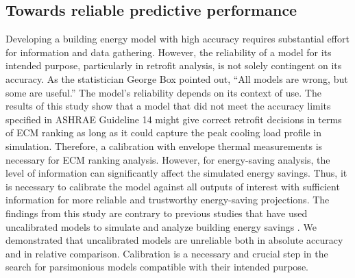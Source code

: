 \documentclass[3p,times,12pt]{elsarticle}
\begin{document}
\begin{sloppypar}
\subsection{Towards reliable predictive performance}
\label{S:4.2}
Developing a building energy model with high accuracy requires substantial effort for information and data gathering. However, the reliability of a model for its intended purpose, particularly in retrofit analysis, is not solely contingent on its accuracy. As the statistician George Box pointed out, “All models are wrong, but some are useful.” The model's reliability depends on its context of use. The results of this study show that a model that did not meet the accuracy limits specified in ASHRAE Guideline 14 \cite{guideline200214} might give correct retrofit decisions in terms of ECM ranking as long as it could capture the peak cooling load profile in simulation. Therefore, a calibration with envelope thermal measurements is necessary for ECM ranking analysis. However, for energy-saving analysis, the level of information can significantly affect the simulated energy savings. Thus, it is necessary to calibrate the model against all outputs of interest with sufficient information for more reliable and trustworthy energy-saving projections. The findings from this study are contrary to previous studies that have used uncalibrated models to simulate and analyze building energy savings \cite{ye2021evaluating, sun2017framework, heo2015scalable}. We demonstrated that uncalibrated models are unreliable both in absolute accuracy and in relative comparison. Calibration is a necessary and crucial step in the search for parsimonious models compatible with their intended purpose.


\end{sloppypar}
\end{document}
